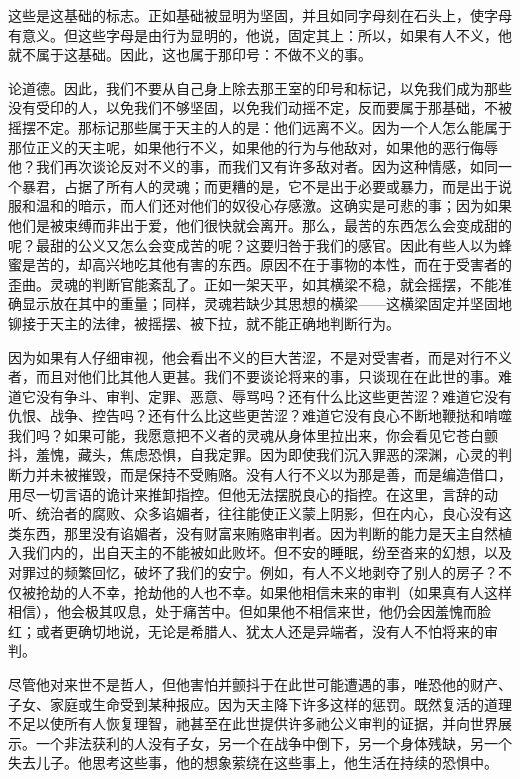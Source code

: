 这些是这基础的标志。正如基础被显明为坚固，并且如同字母刻在石头上，使字母有意义。但这些字母是由行为显明的，他说，固定其上：所以，如果有人不义，他就不属于这基础。因此，这也属于那印号：不做不义的事。\par

论道德。因此，我们不要从自己身上除去那王室的印号和标记，以免我们成为那些没有受印的人，以免我们不够坚固，以免我们动摇不定，反而要属于那基础，不被摇摆不定。那标记那些属于天主的人的是：他们远离不义。因为一个人怎么能属于那位正义的天主呢，如果他行不义，如果他的行为与他敌对，如果他的恶行侮辱他？我们再次谈论反对不义的事，而我们又有许多敌对者。因为这种情感，如同一个暴君，占据了所有人的灵魂；而更糟的是，它不是出于必要或暴力，而是出于说服和温和的暗示，而人们还对他们的奴役心存感激。这确实是可悲的事；因为如果他们是被束缚而非出于爱，他们很快就会离开。那么，最苦的东西怎么会变成甜的呢？最甜的公义又怎么会变成苦的呢？这要归咎于我们的感官。因此有些人以为蜂蜜是苦的，却高兴地吃其他有害的东西。原因不在于事物的本性，而在于受害者的歪曲。灵魂的判断官能紊乱了。正如一架天平，如其横梁不稳，就会摇摆，不能准确显示放在其中的重量；同样，灵魂若缺少其思想的横梁——这横梁固定并坚固地铆接于天主的法律，被摇摆、被下拉，就不能正确地判断行为。\par

因为如果有人仔细审视，他会看出不义的巨大苦涩，不是对受害者，而是对行不义者，而且对他们比其他人更甚。我们不要谈论将来的事，只谈现在在此世的事。难道它没有争斗、审判、定罪、恶意、辱骂吗？还有什么比这些更苦涩？难道它没有仇恨、战争、控告吗？还有什么比这些更苦涩？难道它没有良心不断地鞭挞和啃噬我们吗？如果可能，我愿意把不义者的灵魂从身体里拉出来，你会看见它苍白颤抖，羞愧，藏头，焦虑恐惧，自我定罪。因为即使我们沉入罪恶的深渊，心灵的判断力并未被摧毁，而是保持不受贿赂。没有人行不义以为那是善，而是编造借口，用尽一切言语的诡计来推卸指控。但他无法摆脱良心的指控。在这里，言辞的动听、统治者的腐败、众多谄媚者，往往能使正义蒙上阴影，但在内心，良心没有这类东西，那里没有谄媚者，没有财富来贿赂审判者。因为判断的能力是天主自然植入我们内的，出自天主的不能被如此败坏。但不安的睡眠，纷至沓来的幻想，以及对罪过的频繁回忆，破坏了我们的安宁。例如，有人不义地剥夺了别人的房子？不仅被抢劫的人不幸，抢劫他的人也不幸。如果他相信未来的审判（如果真有人这样相信），他会极其叹息，处于痛苦中。但如果他不相信来世，他仍会因羞愧而脸红；或者更确切地说，无论是希腊人、犹太人还是异端者，没有人不怕将来的审判。\par

尽管他对来世不是哲人，但他害怕并颤抖于在此世可能遭遇的事，唯恐他的财产、子女、家庭或生命受到某种报应。因为天主降下许多这样的惩罚。既然复活的道理不足以使所有人恢复理智，祂甚至在此世提供许多祂公义审判的证据，并向世界展示。一个非法获利的人没有子女，另一个在战争中倒下，另一个身体残缺，另一个失去儿子。他思考这些事，他的想象萦绕在这些事上，他生活在持续的恐惧中。\par

